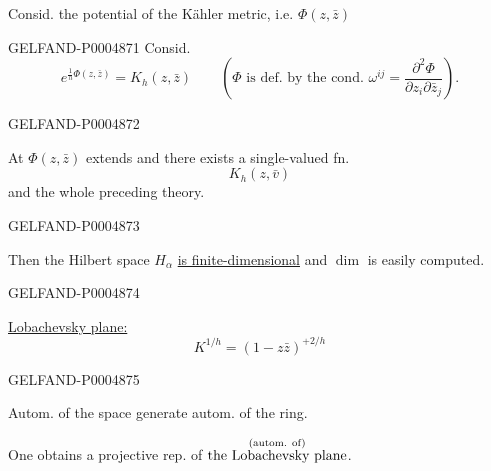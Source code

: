 Consid. the potential of the Kähler metric, i.e. $\Phi(z,\bar z)$


\begin{GelfandAdjacentEvidence}{GELFAND-P000487}{1}
Consid.
\[
e^{\frac1h\Phi(z,\bar z)}=K_h(z,\bar z)
\qquad
\left(\Phi\text{ is def. by the cond. }\omega^{ij}=
\frac{\partial^2\Phi}{\partial z_i\partial\bar z_j}\right).
\]
\end{GelfandAdjacentEvidence}
\begin{GelfandAdjacentEvidence}{GELFAND-P000487}{2}


At
\begingroup\color{black}\endgroup
$\Phi(z,\bar z)$ extends and there exists a single-valued fn.
\[
K_h(z,\bar v)
\]
and the whole preceding theory.
\end{GelfandAdjacentEvidence}
\begin{GelfandAdjacentEvidence}{GELFAND-P000487}{3}


Then the Hilbert space $H_\alpha$ \uline{is finite-dimensional}
and $\dim$ is easily computed.
\end{GelfandAdjacentEvidence}
\begin{GelfandAdjacentEvidence}{GELFAND-P000487}{4}


\uline{Lobachevsky plane:}
\[
K^{1/h}=(1-z\bar z)^{+2/h}
\]
\end{GelfandAdjacentEvidence}
\begin{GelfandAdjacentEvidence}{GELFAND-P000487}{5}


Autom. of the space generate autom. of the ring.

One obtains a projective rep. of
$\overset{\text{\scriptsize (autom. of)}}{\text{the Lobachevsky plane}}$.
\end{GelfandAdjacentEvidence}



